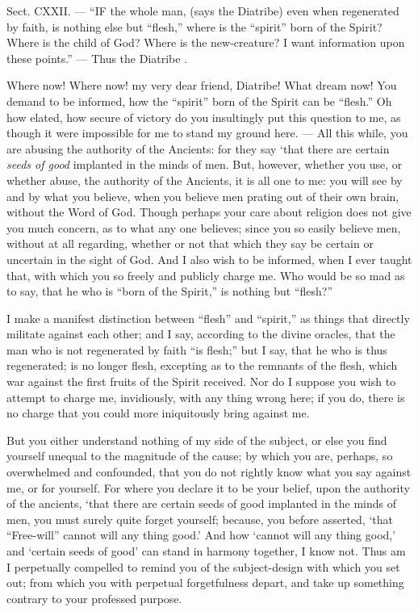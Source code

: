 
Sect. CXXII. — “IF the whole man, (says the Diatribe) even when regenerated by faith, is nothing else but “flesh,” where is the “spirit” born of the Spirit? Where is the child of God? Where is the new-creature? I want information upon these points.” — Thus the Diatribe .

Where now! Where now! my very dear friend, Diatribe! What dream now! You demand to be informed, how the “spirit” born of the Spirit can be “flesh.” Oh how elated, how secure of victory do you insultingly put this question to me, as though it were impossible for me to stand my ground here. — All this while, you are abusing the authority of the Ancients: for they say ‘that there are certain \emph{seeds of good }implanted in the minds of men. But, however, whether you use, or whether abuse, the authority of the Ancients, it is all one to me: you will see by and by what you believe, when you believe men prating out of their own brain, without the Word of God. Though perhaps your care about religion does not give you much concern, as to what any one believes; since you so easily believe men, without at all regarding, whether or not that which they say be certain or uncertain in the sight of God. And I also wish to be informed, when I ever taught that, with which you so freely and publicly charge me. Who would be so mad as to say, that he who is “born of the Spirit,” is nothing but “flesh?”

I make a manifest distinction between “flesh” and “spirit,” as things that directly militate against each other; and I say, according to the divine oracles, that the man who is not regenerated by faith “is flesh;” but I say, that he who is thus regenerated; is no longer flesh, excepting as to the remnants of the flesh, which war against the first fruits of the Spirit received. Nor do I suppose you wish to attempt to charge me, invidiously, with any thing wrong here; if you do, there is no charge that you could more iniquitously bring against me.

But you either understand nothing of my side of the subject, or else you find yourself unequal to the magnitude of the cause; by which you are, perhaps, so overwhelmed and confounded, that you do not rightly know what you say against me, or for yourself. For where you declare it to be your belief, upon the authority of the ancients, ‘that there are certain seeds of good implanted in the minds of men, you must surely quite forget yourself; because, you before asserted, ‘that “Free-will” cannot will any thing good.’ And how ‘cannot will any thing good,’ and ‘certain seeds of good’ can stand in harmony together, I know not. Thus am I perpetually compelled to remind you of the subject-design with which you set out; from which you with perpetual forgetfulness depart, and take up something contrary to your professed purpose.

